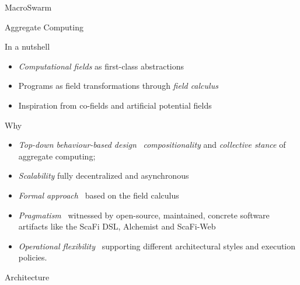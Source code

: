 \documentclass[presentation, 9pt]{beamer}\mode<presentation>{\usetheme{AMSBolognaFC}}
\begin{document}
\begin{frame}{MacroSwarm}

\end{frame}
\begin{frame}{Aggregate Computing}
\begin{alertblock}{In a nutshell}
\begin{itemize}
	\item \emph{Computational fields} as first-class abstractions
	\item Programs as field transformations through \emph{field calculus} 
	\item Inspiration from co-fields and artificial potential fields
\end{itemize}
\end{alertblock}
\begin{block}{Why}
\begin{itemize}
	\item \emph{Top-down behaviour-based design} \faArrowRight \, \emph{compositionality} and \emph{collective stance} of aggregate computing;
	\item \emph{Scalability} \faArrowRight fully decentralized and asynchronous
	\item \emph{Formal approach} \faArrowRight \, based on the field calculus
		
	\item \emph{Pragmatism} \faArrowRight \, witnessed by open-source, maintained, concrete software artifacts like the ScaFi DSL, Alchemist and {\sc{}ScaFi-Web}
	\item \emph{Operational flexibility} \faArrowRight \, supporting different architectural styles and execution policies.
\end{itemize}
\end{block}
\end{frame}

\begin{frame}{Architecture}
\centering
{}
\end{frame}
\end{document}
